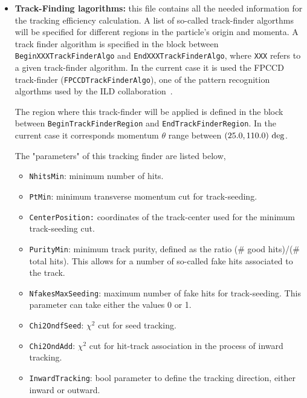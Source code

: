 \begin{itemize}
  \item  {\bf Track-Finding lagorithms:} this file contains all the needed information for the tracking efficiency calculation. A list of so-called 
  track-finder algorthms will be specified for different regions in the particle's origin and momenta. A track finder algorithm is specified in the 
  block between {\tt BeginXXXTrackFinderAlgo} and {\tt EndXXXTrackFinderAlgo}, where {\tt XXX} refers to a given track-finder algorithm. In the current 
  case it is used the FPCCD track-finder ({\tt FPCCDTrackFinderAlgo}), one of the pattern recognition algorthms used by the ILD collaboration~\cite{bib:ILD_FPCCD_TrackFinder}.
  
  The region where this track-finder will be applied is defined in the block between {\tt BeginTrackFinderRegion} and {\tt EndTrackFinderRegion}. In 
  the current case it corresponds momentum $\theta$ range between $(25.0,110.0)~{\rm deg}$.
  
  The "parameters" of this tracking finder are listed below,
  \begin{itemize}
    \item  {\tt NhitsMin}: minimum number of hits.
    
    \item  {\tt PtMin}: minimum transverse momentum cut for track-seeding.
    
    \item  {\tt CenterPosition:} coordinates of the track-center used for the minimum track-seeding cut.
    
    \item  {\tt PurityMin}: minimum track purity, defined as the ratio (\# good hits)/(\# total hits). This allows for a number of so-called fake 
    hits associated to the track.
    
    \item  {\tt NfakesMaxSeeding}: maximum number of fake hits for track-seeding. This parameter can take either the values 0 or 1.
    
    \item  {\tt Chi2OndfSeed}: $\chi^2$ cut for seed tracking.
    
    \item  {\tt Chi2OndAdd}: $\chi^2$ cut for hit-track association in the process of inward tracking.
    
    \item  {\tt InwardTracking}: bool parameter to define the tracking direction, either inward or outward.
    

\end{itemize}
\end{itemize}
